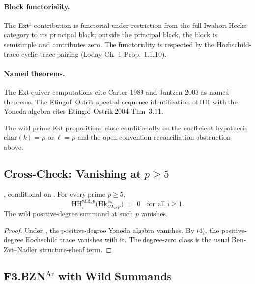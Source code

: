 \paragraph{Block functoriality.} The Ext\({}^{1}\)-contribution
is functorial under restriction from the full Iwahori Hecke
category to its principal block; outside the principal block, the
block is semisimple and contributes zero. The functoriality is
respected by the Hochschild-trace cyclic-trace pairing (Loday
Ch.~1 Prop.~1.1.10).

\paragraph{Named theorems.} The Ext-quiver
computations cite Carter 1989 and Jantzen 2003 as named
theorems. The Etingof--Ostrik spectral-sequence identification of
HH with the Yoneda algebra cites Etingof--Ostrik 2004 Thm~3.11.

The wild-prime Ext propositions close conditionally on the
coefficient hypothesis \(\mathrm{char}(k)=p\) or \(\ell=p\)
and the open convention-reconciliation obstruction above.

\subsection{Cross-Check: Vanishing at \(p\geq 5\)}

\begin{theorem}
\label{v4-arith:bzn-rcompletion:thm:R4-correction-vanishes-p-large}
\ClaimStatusProvedHereConditional, conditional on
. For
every prime \(p\geq 5\),
\begin{equation}
\mathrm{HH}_{i}^{\mathrm{wild},p}\bigl(\mathrm{Hk}^{\mathrm{Iw}}_{GL_{2},p}\bigr)\;=\;0\quad\text{for all }i\geq 1.
\end{equation}
The wild positive-degree summand at such \(p\) vanishes.
\end{theorem}

\begin{proof}
Under ,
the positive-degree Yoneda algebra vanishes. By
(4), the positive-degree
Hochschild trace vanishes with it. The degree-zero class is the usual
Ben-Zvi--Nadler structure-sheaf term.
\end{proof}

\subsection{F3.BZN\({}^{\mathrm{Ar}}\) with Wild Summands}

